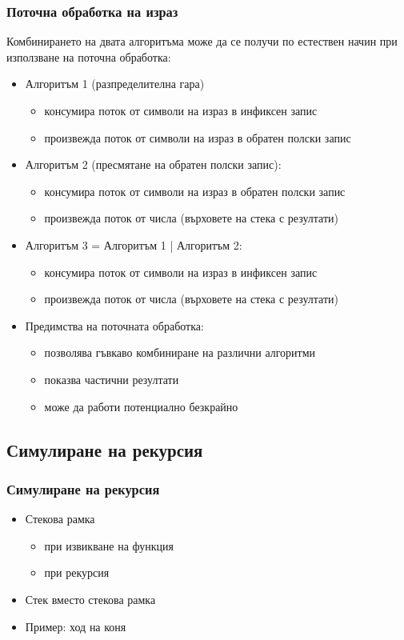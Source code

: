 \documentclass[alsotrans]{beamerswitch}
\begin{document}
\begin{frame}
  \frametitle{Поточна обработка на израз}
  Комбинирането на двата алгоритъма може да се получи по естествен начин при използване на \alert{поточна обработка}:\pause
  \begin{itemize}[<+->]
  \item Алгоритъм 1 (разпределителна гара)
    \begin{itemize}
    \item консумира поток от символи на израз в инфиксен запис
    \item произвежда поток от символи на израз в обратен полски запис
    \end{itemize}
  \item Алгоритъм 2 (пресмятане на обратен полски запис):
    \begin{itemize}
    \item консумира поток от символи на израз в обратен полски запис
    \item произвежда поток от числа (върховете на стека с резултати)
    \end{itemize}
  \item Алгоритъм 3 = Алгоритъм 1 | Алгоритъм 2:
    \begin{itemize}
    \item консумира поток от символи на израз в инфиксен запис
    \item произвежда поток от числа (върховете на стека с резултати)
    \end{itemize}
  \item Предимства на поточната обработка:
    \begin{itemize}
    \item позволява гъвкаво комбиниране на различни алгоритми
    \item показва частични резултати
    \item може да работи потенциално безкрайно
    \end{itemize}
  \end{itemize}
\end{frame}

\subsection{Симулиране на рекурсия}

\begin{frame}
  \frametitle{Симулиране на рекурсия}

  \begin{itemize}
  \item Стекова рамка
    \begin{itemize}
    \item при извикване на функция
    \item при рекурсия
    \end{itemize}
  \item Стек вместо стекова рамка
  \item Пример: ход на коня
  \end{itemize}
\end{frame}
\end{document}

